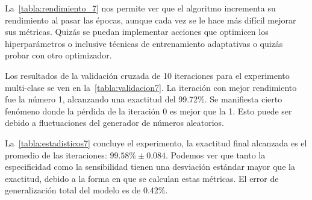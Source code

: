 La~\autoref{tabla:rendimiento_7} nos permite ver que el algoritmo incrementa su
rendimiento al pasar las épocas, aunque cada vez se le hace más difícil mejorar
sus métricas. Quizás se puedan implementar acciones que optimicen los
hiperparámetros o inclusive técnicas de entrenamiento adaptativas o quizás
probar con otro optimizador.

Los resultados de la validación cruzada de 10 iteraciones para el experimento
multi-clase se ven en la~\autoref{tabla:validacion7}. La iteración con mejor
rendimiento fue la número 1, alcanzando una exactitud del 99.72\%. Se manifiesta
cierto fenómeno donde la pérdida de la iteración 0 es mejor que la 1. Esto puede
ser debido a fluctuaciones del generador de números aleatorios.

\begin{table}[H]
    \centering
    \caption{Resultados de la validación cruzada multi-clase}
    \label{tabla:validacion7}
    \end{table}

La~\autoref{tabla:estadisticos7} concluye el experimento, la exactitud final
alcanzada es el promedio de las iteraciones: $99.58\% \pm 0.084$. Podemos ver
que tanto la especificidad como la sensibilidad tienen una desviación estándar
mayor que la exactitud, debido a la forma en que se calculan estas métricas. El
error de generalización total del modelo es de 0.42\%.

